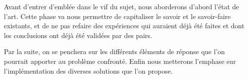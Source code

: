 Avant d'entrer d'emblée dans le vif du sujet, nous aborderons 
d'abord l'état de l'art. Cette phase va nous permettre de capitaliser le 
savoir et le savoir-faire existants, et de ne pas refaire des expériences 
qui auraient déjà été faites et dont les conclusions ont déjà été validées 
par des pairs.
\par
Par la suite, on se penchera sur les différents éléments de réponse que l'on 
pourrait apporter au problème confronté.
Enfin nous metterons l'emphase sur l'implémentation des diverses solutions 
que l'on propose.
